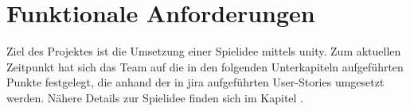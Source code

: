 \documentclass[../main.tex]{subfiles}
\begin{document}
    \section{Funktionale Anforderungen}
    \label{section:FunktionaleAnforderungen}
    Ziel des Projektes ist die Umsetzung einer Spielidee mittels \gls{unity}. Zum aktuellen Zeitpunkt hat sich das Team auf die in den folgenden Unterkapiteln aufgeführten Punkte festgelegt, die anhand der in \gls{jira} aufgeführten User-Stories umgesetzt werden. Nähere Details zur Spielidee finden sich im Kapitel .
\end{document}
